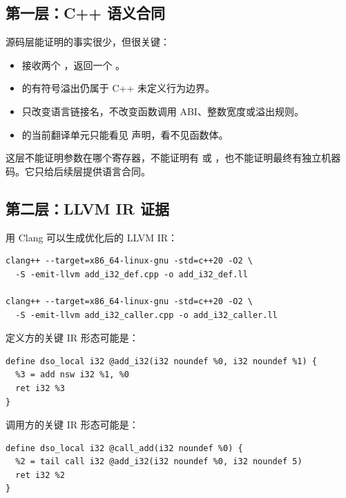 \subsection{第一层：C++ 语义合同}

源码层能证明的事实很少，但很关键：

\begin{itemize}
  \item {} 接收两个 ，返回一个 。
  \item {} 的有符号溢出仍属于 C++ 未定义行为边界。
  \item {} 只改变语言链接名，不改变函数调用 ABI、整数宽度或溢出规则。
  \item {} 的当前翻译单元只能看见  声明，看不见函数体。
\end{itemize}

这层不能证明参数在哪个寄存器，不能证明有  或 ，也不能证明最终有独立机器码。它只给后续层提供语言合同。

\subsection{第二层：LLVM IR 证据}

用 Clang 可以生成优化后的 LLVM IR：

\begin{lstlisting}[numbers=none,caption={生成 IR}]
clang++ --target=x86_64-linux-gnu -std=c++20 -O2 \
  -S -emit-llvm add_i32_def.cpp -o add_i32_def.ll

clang++ --target=x86_64-linux-gnu -std=c++20 -O2 \
  -S -emit-llvm add_i32_caller.cpp -o add_i32_caller.ll
\end{lstlisting}

定义方的关键 IR 形态可能是：

\begin{lstlisting}[numbers=none,caption={定义方 IR 的关键片段}]
define dso_local i32 @add_i32(i32 noundef %0, i32 noundef %1) {
  %3 = add nsw i32 %1, %0
  ret i32 %3
}
\end{lstlisting}

调用方的关键 IR 形态可能是：

\begin{lstlisting}[numbers=none,caption={调用方 IR 的关键片段}]
define dso_local i32 @call_add(i32 noundef %0) {
  %2 = tail call i32 @add_i32(i32 noundef %0, i32 noundef 5)
  ret i32 %2
}
\end{lstlisting}

